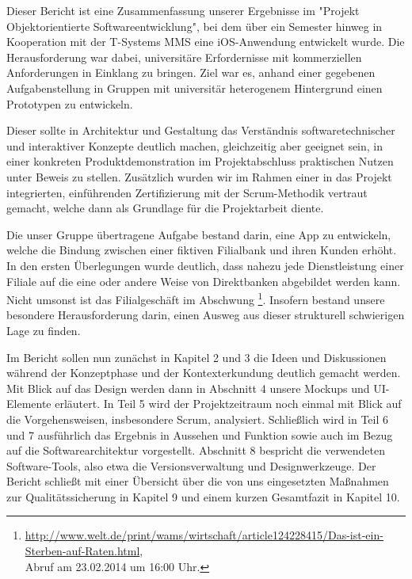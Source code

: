 	Dieser Bericht ist eine Zusammenfassung unserer Ergebnisse im "Projekt Objektorientierte Softwareentwicklung", bei dem über ein Semester hinweg in Kooperation mit der T-Systems MMS eine iOS-Anwendung entwickelt wurde. Die Herausforderung war dabei, universitäre Erfordernisse mit kommerziellen Anforderungen in Einklang zu bringen. Ziel war es, anhand einer gegebenen Aufgabenstellung in Gruppen mit universitär heterogenem Hintergrund einen Prototypen zu entwickeln.
	
	Dieser sollte in Architektur und Gestaltung das Verständnis softwaretechnischer und interaktiver Konzepte deutlich machen, gleichzeitig aber geeignet sein, in einer konkreten Produktdemonstration im Projektabschluss praktischen Nutzen unter Beweis zu stellen. Zusätzlich wurden wir im Rahmen einer in das Projekt integrierten, einführenden Zertifizierung mit der Scrum-Methodik vertraut gemacht, welche dann als Grundlage für die Projektarbeit diente. 

	Die unser Gruppe übertragene Aufgabe bestand darin, eine App zu entwickeln, welche die Bindung zwischen einer fiktiven Filialbank und ihren Kunden erhöht. In den ersten Überlegungen wurde deutlich, dass nahezu jede Dienstleistung einer Filiale auf die eine oder andere Weise von Direktbanken abgebildet werden kann. Nicht umsonst ist das Filialgeschäft im Abschwung \footnote{\url{http://www.welt.de/print/wams/wirtschaft/article124228415/Das-ist-ein-Sterben-auf-Raten.html}, \\Abruf am 23.02.2014 um 16:00 Uhr.}. Insofern bestand unsere besondere Herausforderung darin, einen Ausweg aus dieser strukturell schwierigen Lage zu finden.
	
	Im Bericht sollen nun zunächst in Kapitel 2 und 3 die Ideen und Diskussionen während der Konzeptphase und der Kontexterkundung deutlich gemacht werden. Mit Blick auf das Design werden dann in Abschnitt 4 unsere Mockups und UI-Elemente erläutert. In Teil 5 wird der Projektzeitraum noch einmal mit Blick auf die Vorgehensweisen, insbesondere Scrum, analysiert. Schließlich wird in Teil 6 und 7 ausführlich das Ergebnis in Aussehen und Funktion sowie auch im Bezug auf die Softwarearchitektur vorgestellt. Abschnitt 8 bespricht die verwendeten Software-Tools, also etwa die Versionsverwaltung und Designwerkzeuge. Der Bericht schließt mit einer Übersicht über die von uns eingesetzten Maßnahmen zur Qualitätssicherung in Kapitel 9 und einem kurzen Gesamtfazit in Kapitel 10.
	 